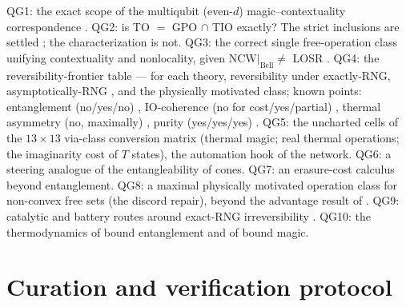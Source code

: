 \documentclass[11pt,a4paper]{article}
\theoremstyle{definition}
\begin{document}
QG1: the exact scope of the multiqubit (even-$d$) magic--contextuality
correspondence \cite{howard2014}. QG2: is TO $=$ GPO $\cap$ TIO exactly? The
strict inclusions are settled \cite{faist2015}; the characterization is not.
QG3: the correct single free-operation class unifying contextuality and
nonlocality, given NCW$|_{\mathrm{Bell}}\neq$ LOSR \cite{santos2024,amaral2018}.
QG4: the reversibility-frontier table --- for each theory, reversibility
under exactly-RNG, asymptotically-RNG \cite{hayashiyamasaki2024,lami2024},
and the physically motivated class; known points: entanglement (no/yes/no)
\cite{lamiregula2023}, IO-coherence (no for cost/yes/partial)
\cite{winteryang2016,brandaogour2015}, thermal asymmetry (no, maximally)
\cite{marvian2020}, purity (yes/yes/yes) \cite{gour2015}. QG5: the uncharted
cells of the $13\times13$ via-class conversion matrix (thermal magic; real
thermal operations; the imaginarity cost of $T$ states), the automation hook
of the network. QG6: a steering analogue of the entangleability of cones.
QG7: an erasure-cost calculus beyond entanglement. QG8: a maximal physically
motivated operation class for non-convex free sets (the discord repair),
beyond the advantage result of \cite{kuroiwa2024}. QG9: catalytic and
battery routes around exact-RNG irreversibility \cite{datta2023}. QG10: the
thermodynamics of bound entanglement and of bound magic.

\section{Curation and verification protocol}\label{sec:protocol}
\end{document}
